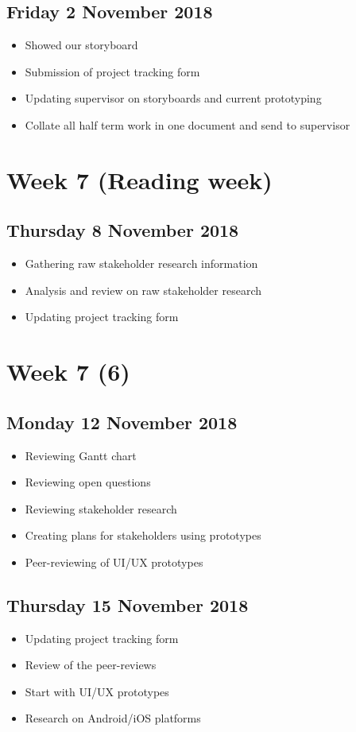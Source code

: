 \subsection*{Friday 2 November 2018}
\begin{itemize}
    \item Showed our storyboard
    \item Submission of project tracking form
	\item Updating supervisor on storyboards and current prototyping
	\item Collate all half term work in one document and send to supervisor
\end{itemize}

\section*{Week 7 (Reading week)}
\subsection*{Thursday 8 November 2018}
\begin{itemize}
	\item Gathering raw stakeholder research information
	\item Analysis and review on raw stakeholder research
	\item Updating project tracking form
\end{itemize}

\section*{Week 7 (6)}
\subsection*{Monday 12 November 2018}
\begin{itemize}
	\item Reviewing Gantt chart
    \item Reviewing open questions
    \item Reviewing stakeholder research
    \item Creating plans for stakeholders using prototypes
    \item Peer-reviewing of UI/UX prototypes
\end{itemize}

\subsection*{Thursday 15 November 2018}
\begin{itemize}
    \item Updating project tracking form
	\item Review of the peer-reviews
	\item Start with UI/UX prototypes
	\item Research on Android/iOS platforms
\end{itemize}

